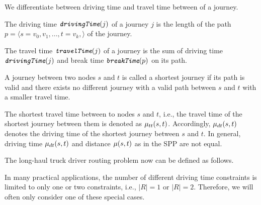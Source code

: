 We differentiate between driving time and travel time between of a journey.

\begin{definition}
	The driving time $\texttt{\itshape drivingTime}(j)$ of a journey $j$ is the length of the path $p = \langle s=v_0,v_1,...,t=v_k, \rangle$ of the journey.
\end{definition}

\begin{definition}
	The travel time $\texttt{\itshape travelTime}(j)$ of a journey is the sum of driving time $\texttt{\itshape drivingTime}(j)$ and break time  $\texttt{\itshape breakTime}(p)$ on its path.
\end{definition}

\begin{definition}
	A journey between two nodes $s$ and $t$ is called a shortest journey if its path is valid and there exists no different journey with a valid path between $s$ and $t$ with a smaller travel time.
\end{definition}

The shortest travel time between to nodes $s$ and $t$, i.e., the travel time of the shortest journey between them is denoted as $\mu_{tt}(s,t)$. Accordingly, $\mu_{dt}(s,t)$ denotes the driving time of the shortest journey between $s$ and $t$. In general, driving time $\mu_{dt}(s,t)$ and distance $\mu(s,t)$ as in the SPP are not equal.

The long-haul truck driver routing problem now can be defined as follows.

\begin{namedproblem}
\end{namedproblem}

In many practical applications, the number of different driving time constraints is limited to only one or two constraints, i.e., $|R| = 1$ or  $|R| = 2$. Therefore, we will often only consider one of these special cases.